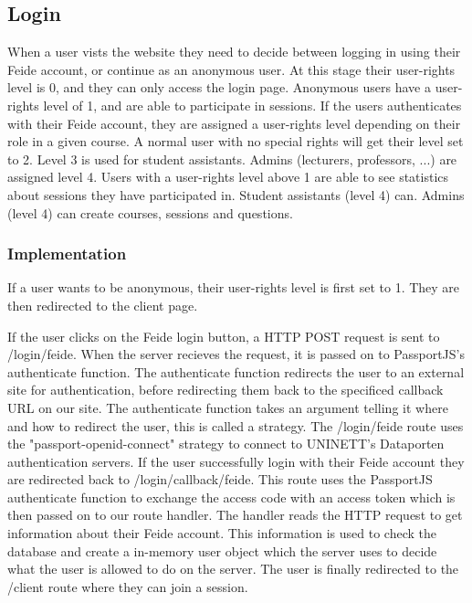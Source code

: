 \subsection{Login}
When a user vists the website they need to decide between logging in using their Feide account, or continue as an anonymous user. At this stage their user-rights level is 0, and they can only access the login page. Anonymous users have a user-rights level of 1, and are able to participate in sessions. If the users authenticates with their Feide account, they are assigned a user-rights level depending on their role in a given course. A normal user with no special rights will get their level set to 2. Level 3 is used for student assistants. Admins (lecturers, professors, ...) are assigned level 4. Users with a user-rights level above 1 are able to see statistics about sessions they have participated in. Student assistants (level 4) can.
Admins (level 4) can create courses, sessions and questions.
\subsubsection{Implementation}
If a user wants to be anonymous, their user-rights level is first set to 1. They are then redirected to the client page.
\par
If the user clicks on the Feide login button, a HTTP POST request is sent to /login/feide. When the server recieves the request, it is passed on to PassportJS's authenticate function. The authenticate function redirects the user to an external site for authentication, before redirecting them back to the specificed callback URL on our site. The authenticate function takes an argument telling it where and how to redirect the user, this is called a strategy. The /login/feide route uses the "passport-openid-connect" strategy to connect to UNINETT's Dataporten authentication servers. If the user successfully login with their Feide account they are redirected back to /login/callback/feide. This route uses the PassportJS authenticate function to exchange the access code with an access token which is then passed on to our route handler. The handler reads the HTTP request to get information about their Feide account. This information is used to check the database and create a in-memory user object which the server uses to decide what the user is allowed to do on the server. The user is finally redirected to the /client route where they can join a session.